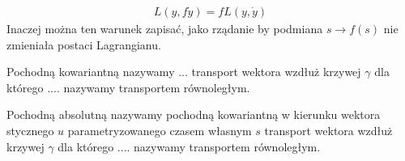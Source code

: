 \begin{align}
 L( y, f \dot{y} ) = f L ( y, \dot{y}  ) 
\end{align} 
Inaczej można ten warunek zapisać, jako rządanie by
podmiana $s \to f(s)$ nie zmieniała postaci Lagrangianu.
\begin{definition}
Pochodną kowariantną nazywamy ...
transport wektora wzdłuż krzywej $\gamma$ dla którego 
.... nazywamy transportem równoległym.
\end{definition}
\begin{definition}
Pochodną absolutną nazywamy pochodną kowariantną w 
kierunku wektora stycznego $u$ parametryzowanego 
czasem własnym $s$
transport wektora wzdłuż krzywej $\gamma$ dla którego 
.... nazywamy transportem równoległym.
\end{definition}



